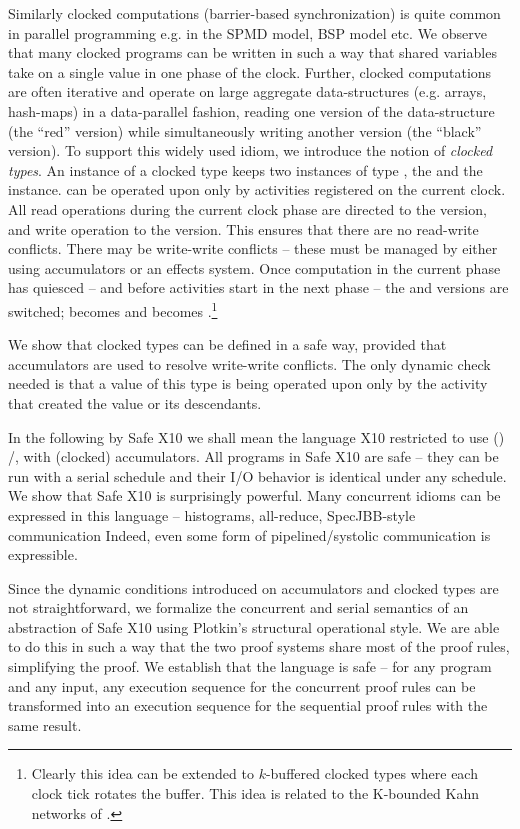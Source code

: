Similarly clocked computations (barrier-based synchronization) is
quite common in parallel programming e.g. in the SPMD model, BSP model
etc. We observe that many clocked programs can be written in such a
way that shared variables take on a single value in one phase of the
clock. Further, clocked computations are often iterative and operate
on large aggregate data-structures (e.g. arrays, hash-maps) in a
data-parallel fashion, reading one version of the data-structure (the
``red'' version) while simultaneously writing another version (the
 ``black'' version). To support this widely used idiom, we introduce
the notion of {\em clocked types}. An instance  of a  clocked type
 keeps two instances of type , the  and
the  instance.  can be operated upon only by
activities registered on the current clock.  All read operations
during the current clock phase are directed to the  version,
and write operation to the  version. This ensures that
there are no read-write conflicts. There may be write-write conflicts
-- these must be managed by either using accumulators or an effects
system. Once computation in the current phase has quiesced -- and
before activities start in the next phase -- the  and
 versions are switched;  becomes  and
 becomes .\footnote{Clearly this idea can be
  extended to $k$-buffered clocked types where each clock tick rotates
  the buffer. This idea is related to the K-bounded Kahn networks of
\cite{Cohen:2006:NSK:1111320.1111054}.}


We show that clocked types can be defined in a safe way, provided that
accumulators are used to resolve write-write conflicts. The only
dynamic check needed is that a value of this type is being operated
upon only by the activity that created the value or its
descendants.

In the following by Safe X10 we shall mean the language X10 restricted
to use () /,  with
(clocked) accumulators.  All programs in Safe X10 are safe -- they can
be run with a serial schedule and their I/O behavior is identical
under any schedule.  We show that Safe X10 is surprisingly
powerful. Many concurrent idioms can be expressed in this language --
histograms, all-reduce, SpecJBB-style communication Indeed, even some
form of pipelined/systolic communication is expressible.

Since the dynamic conditions introduced on accumulators and clocked
types are not straightforward, we formalize the concurrent and serial
semantics of an abstraction of Safe X10 using Plotkin's structural
operational style. We are able to do this in such a way that the two
proof systems share most of the proof rules, simplifying the proof. We
establish that the language is safe -- for any program and any input,
any execution sequence for the concurrent proof rules can be
transformed into an execution sequence for the sequential proof rules
with the same result.

